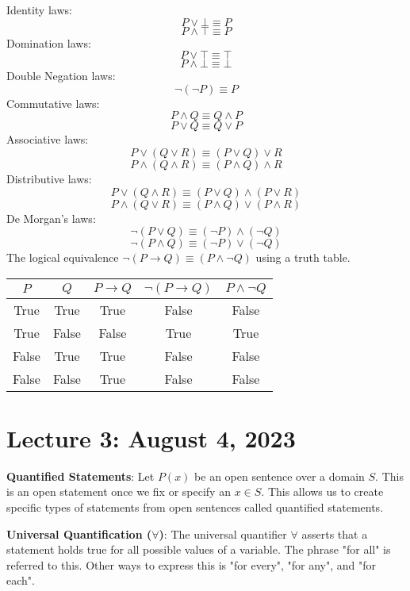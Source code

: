 \documentclass{article}
\begin{document}
Identity laws:
\[P \lor \bot \equiv P\]
\[P \land \top \equiv P\]
Domination laws:
\[P \lor \top \equiv \top\]
\[P \land \bot \equiv \bot\]
Double Negation laws:
\[\neg(\neg P) \equiv P\]
Commutative laws:
\[P \land Q \equiv Q \land P\]
\[P \lor Q \equiv Q \lor P\]
Associative laws:
\[P \lor (Q \lor R) \equiv (P \lor Q) \lor R\]
\[P \land (Q \land R) \equiv  (P \land Q) \land R\] 
Distributive laws:
\[P \lor (Q \land R) \equiv (P \lor Q) \land (P \lor R)\]
\[P \land (Q \lor R) \equiv (P \land Q) \lor (P \land R)\]
De Morgan's laws:
\[\neg (P \lor Q) \equiv (\neg P) \land (\neg Q)\]
\[\neg (P \land Q) \equiv (\neg P) \lor (\neg Q)\]
The logical equivalence \(\neg (P \rightarrow Q) \equiv (P \land \neg Q)\) using a truth table.
\begin{center}
\begin{tabular}{|c|c|c|c|c|}
\hline
\(P\) & \(Q\) & \(P \rightarrow Q\) & \(\neg (P \rightarrow Q)\) & \(P \land \neg Q\) \\
\hline
True & True & True & False & False \\
True & False & False & True & True \\
False & True & True & False & False \\
False & False & True & False & False \\
\hline
\end{tabular}
\end{center}

\section{Lecture 3: August 4, 2023}
\textbf{Quantified Statements}: Let \(P(x)\) be an open sentence over a domain \(S\). This is an open statement once we fix or specify an \(x \in S\). This allows us to create specific types of statements from open sentences called quantified statements.

\textbf{Universal Quantification (\(\forall\))}: The universal quantifier \(\forall\) asserts that a statement holds true for all possible values of a variable. The phrase "for all" is referred to this. Other ways to express this is "for every", "for any", and "for each".
\end{document}
